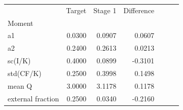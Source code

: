 \begin{tabular}{lrrrrrr}
\toprule
 & Target & Stage 1 & Difference \\
Moment &  &  &  \\
\midrule
a1 & 0.0300 & 0.0907 & 0.0607 \\
a2 & 0.2400 & 0.2613 & 0.0213 \\
sc(I/K) & 0.4000 & 0.0899 & -0.3101 \\
std(CF/K) & 0.2500 & 0.3998 & 0.1498 \\
mean Q & 3.0000 & 3.1178 & 0.1178 \\
external fraction & 0.2500 & 0.0340 & -0.2160 \\
\bottomrule
\end{tabular}
